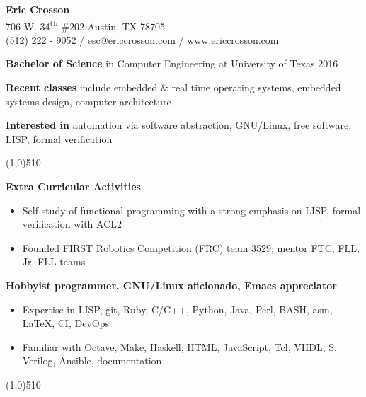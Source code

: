 \documentclass{report}
\newcommand{\cut}{\begin{center} \line(1,0){510} \end{center}}
\begin{document}
\pagestyle{empty}
\setlength\parindent{0pt}

\begin{center}
  \textbf{Eric Crosson} \\
  706 W. 34\textsuperscript{th} \#202 Austin, TX 78705 \\
  (512) 222 - 9052 / esc@ericcrosson.com / www.ericcrosson.com
\end{center}

\textbf{Bachelor of Science} in Computer Engineering at University of Texas
2016

\vspace{1mm}

\textbf{Recent classes} include embedded \& real time operating systems,
embedded systems design, computer architecture

\vspace{1mm}

\textbf{Interested in} automation via software abstraction, GNU/Linux, free
software, LISP, formal verification

\cut{}

\textbf{Extra Curricular Activities}
\begin{itemize}[label=$\circ$]
\item Self-study of functional programming with a strong emphasis on LISP, formal verification with ACL2
\item Founded FIRST Robotics Competition (FRC) team 3529; mentor FTC, FLL, Jr. FLL teams
\end{itemize}

\textbf{Hobbyist programmer, GNU/Linux aficionado, Emacs appreciator}
\begin{itemize}[label=$\circ$]
\item Expertise in LISP, git, Ruby, C/C++, Python, Java, Perl, BASH, asm,
  \LaTeX{}, CI, DevOps
\item Familiar with Octave, Make, Haskell, HTML, JavaScript, Tcl, VHDL, S.
  Verilog, Ansible, documentation
\end{itemize}

\cut{}
\end{document}
